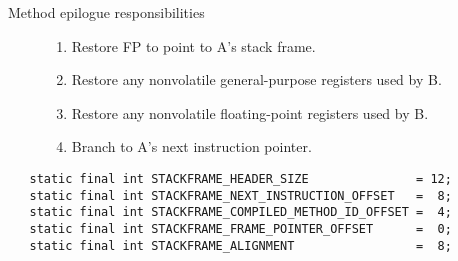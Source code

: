 \begin{description}
\item [Method epilogue responsibilities]

\begin{enumerate}
\item Restore FP to point to A's stack frame.

\item Restore any nonvolatile general-purpose registers used by B.

\item Restore any nonvolatile floating-point registers used by B.

\item Branch to A's next instruction pointer.
\end{enumerate}
\end{description}



\begin{verbatim} 
   static final int STACKFRAME_HEADER_SIZE               = 12;
   static final int STACKFRAME_NEXT_INSTRUCTION_OFFSET   =  8;
   static final int STACKFRAME_COMPILED_METHOD_ID_OFFSET =  4;
   static final int STACKFRAME_FRAME_POINTER_OFFSET      =  0;
   static final int STACKFRAME_ALIGNMENT                 =  8;
\end{verbatim}



